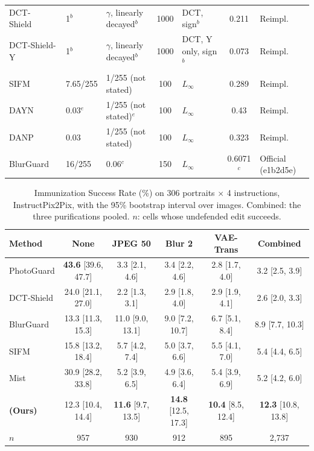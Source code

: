 \begin{table}[t]
\begin{tabular}{@{}l l l c l c l@{}}
    DCT-Shield~\cite{dctshield2025} & 1$^{b}$ & $\gamma$, linearly decayed$^{b}$ & 1000 & DCT, sign$^{b}$ & 0.211 & Reimpl. \\
    DCT-Shield-Y~\cite{dctshield2025} & 1$^{b}$ & $\gamma$, linearly decayed$^{b}$ & 1000 & DCT, Y only, sign$^{b}$ & 0.073 & Reimpl. \\
    SIFM~\cite{dong2025sifm} & 7.65/255 & 1/255 (not stated) & 100 & $L_\infty$ & 0.289 & Reimpl. \\
    DAYN~\cite{lo2024dayn} & 0.03$^{e}$ & 1/255 (not stated)$^{e}$ & 100 & $L_\infty$ & 0.43 & Reimpl. \\
    DANP~\cite{zhang2025danp} & 0.03 & 1/255 (not stated) & 100 & $L_\infty$ & 0.323 & Reimpl. \\
    BlurGuard~\cite{blurguard2025} & 16/255 & 0.06$^{c}$ & 150 & $L_\infty$ & 0.6071$^{c}$ & Official (e1b2d5e) \\
    \bottomrule
  \end{tabular}
\end{table}

\begin{table}[t]
  \centering
  \footnotesize
  \setlength{\tabcolsep}{4pt}
  \caption{Immunization Success Rate (\%) on 306 portraits $\times$ 4 instructions, InstructPix2Pix, with the 95\% bootstrap interval over images. Combined: the three purifications pooled. $n$: cells whose undefended edit succeeds.}
  \label{tab:supp_isr_full}
  \begin{tabular}{@{}l ccccc@{}}
    \toprule
    Method & None & JPEG 50 & Blur 2 & VAE-Trans & Combined \\
    \midrule
    PhotoGuard & \textbf{43.6} [39.6, 47.7] & 3.3 [2.1, 4.6] & 3.4 [2.2, 4.6] & 2.8 [1.7, 4.0] & 3.2 [2.5, 3.9] \\
    DCT-Shield & 24.0 [21.1, 27.0] & 2.2 [1.3, 3.1] & 2.9 [1.8, 4.0] & 2.9 [1.9, 4.1] & 2.6 [2.0, 3.3] \\
    BlurGuard & 13.3 [11.3, 15.3] & 11.0 [9.0, 13.1] & 9.0 [7.2, 10.7] & 6.7 [5.1, 8.4] & 8.9 [7.7, 10.3] \\
    SIFM & 15.8 [13.2, 18.4] & 5.7 [4.2, 7.4] & 5.0 [3.7, 6.6] & 5.5 [4.1, 7.0] & 5.4 [4.4, 6.5] \\
    Mist & 30.9 [28.2, 33.8] & 5.2 [3.9, 6.5] & 4.9 [3.6, 6.4] & 5.4 [3.9, 6.9] & 5.2 [4.2, 6.0] \\
    \midrule
    \rowcolor{oursrow}
    \textbf{\capg{} (Ours)} & 12.3 [10.4, 14.4] & \textbf{11.6} [9.7, 13.5] & \textbf{14.8} [12.5, 17.3] & \textbf{10.4} [8.5, 12.4] & \textbf{12.3} [10.8, 13.8] \\
    \midrule
    $n$ & 957 & 930 & 912 & 895 & 2{,}737 \\
    \bottomrule
  \end{tabular}
\end{table}

